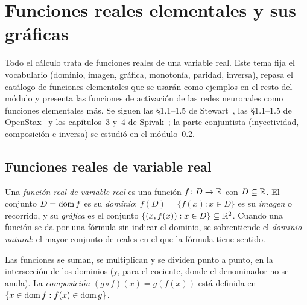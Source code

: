 \chapter{Funciones reales elementales y sus gráficas}
\label{tema:1}

Todo el cálculo trata de funciones reales de una variable real. Este tema fija el vocabulario (dominio, imagen, gráfica, monotonía, paridad, inversa), repasa el catálogo de funciones elementales que se usarán como ejemplos en el resto del módulo y presenta las funciones de activación de las redes neuronales como funciones elementales más. Se siguen las §1.1--1.5 de Stewart~\cite{stewart}, las §1.1--1.5 de OpenStax~\cite{osc1} y los capítulos~3 y~4 de Spivak~\cite{spivak}; la parte conjuntista (inyectividad, composición e inversa) se estudió en el módulo~0.2.

\section{Funciones reales de variable real}

\begin{definicion}\label{def:funcion}
Una \emph{función real de variable real} es una función $f\colon D\to\mathbb{R}$ con $D\subseteq\mathbb{R}$. El conjunto $D=\operatorname{dom} f$ es su \emph{dominio}; $f(D)=\{f(x):x\in D\}$ es su \emph{imagen} o recorrido, y su \emph{gráfica} es el conjunto $\{(x,f(x)):x\in D\}\subseteq\mathbb{R}^{2}$. Cuando una función se da por una fórmula sin indicar el dominio, se sobrentiende el \emph{dominio natural}: el mayor conjunto de reales en el que la fórmula tiene sentido.
\end{definicion}

\addtocounter{definicion}{1}%

Las funciones se suman, se multiplican y se dividen punto a punto, en la intersección de los dominios (y, para el cociente, donde el denominador no se anula). La \emph{composición} $(g\circ f)(x)=g(f(x))$ está definida en $\{x\in\operatorname{dom} f: f(x)\in\operatorname{dom} g\}$.

